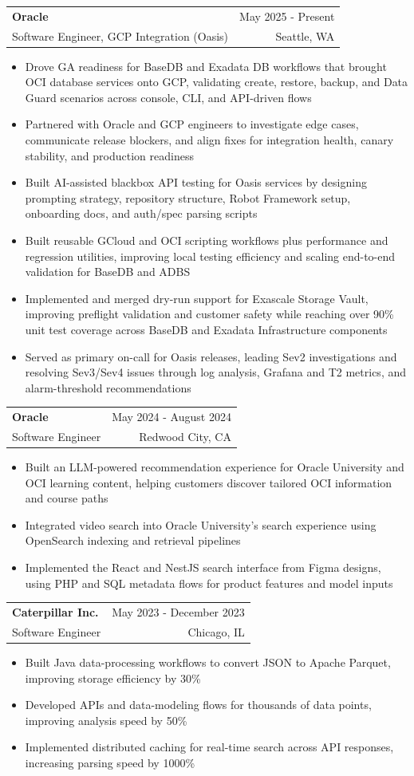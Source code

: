 \documentclass[letterpaper,11pt]{article}
\makeatletter
\newcommand{\resumeItem}[1]{
  \item\small{
    {#1 \vspace{-1pt}}
  }
}
\newcommand{\resumeSubheading}[4]{
  \vspace{-2pt}\item
    \begin{tabular*}{0.97\textwidth}[t]{l@{\extracolsep{\fill}}r}
      \textbf{#1} & #2 \\
      {\small#3} & {\small #4} \\
    \end{tabular*}\vspace{-7pt}
}
\newcommand{\resumeItemListStart}{\begin{itemize}[leftmargin=0.18in,itemsep=1pt,topsep=2pt]}
\newcommand{\resumeItemListEnd}{\end{itemize}\vspace{-5pt}}
\makeatother
\begin{document}
    \resumeSubheading
  {Oracle}{May 2025 - Present}
  {Software Engineer, GCP Integration (Oasis)}{Seattle, WA}
  \resumeItemListStart
    \resumeItem{Drove GA readiness for BaseDB and Exadata DB workflows that brought OCI database services onto GCP, validating create, restore, backup, and Data Guard scenarios across console, CLI, and API-driven flows}
    \resumeItem{Partnered with Oracle and GCP engineers to investigate edge cases, communicate release blockers, and align fixes for integration health, canary stability, and production readiness}
    \resumeItem{Built AI-assisted blackbox API testing for Oasis services by designing prompting strategy, repository structure, Robot Framework setup, onboarding docs, and auth/spec parsing scripts}
    \resumeItem{Built reusable GCloud and OCI scripting workflows plus performance and regression utilities, improving local testing efficiency and scaling end-to-end validation for BaseDB and ADBS}
    \resumeItem{Implemented and merged dry-run support for Exascale Storage Vault, improving preflight validation and customer safety while reaching over 90\% unit test coverage across BaseDB and Exadata Infrastructure components}
    \resumeItem{Served as primary on-call for Oasis releases, leading Sev2 investigations and resolving Sev3/Sev4 issues through log analysis, Grafana and T2 metrics, and alarm-threshold recommendations}
  \resumeItemListEnd

    \resumeSubheading
      {Oracle}{May 2024 - August 2024}
      {Software Engineer}{Redwood City, CA}
      \resumeItemListStart
        \resumeItem{Built an LLM-powered recommendation experience for Oracle University and OCI learning content, helping customers discover tailored OCI information and course paths}
        \resumeItem{Integrated video search into Oracle University's search experience using OpenSearch indexing and retrieval pipelines}
        \resumeItem{Implemented the React and NestJS search interface from Figma designs, using PHP and SQL metadata flows for product features and model inputs}
      \resumeItemListEnd

    \resumeSubheading
      {Caterpillar Inc.}{May 2023 - December 2023}
      {Software Engineer}{Chicago, IL}
      \resumeItemListStart
        \resumeItem{Built Java data-processing workflows to convert JSON to Apache Parquet, improving storage efficiency by 30\%}
        \resumeItem{Developed APIs and data-modeling flows for thousands of data points, improving analysis speed by 50\%}
        \resumeItem{Implemented distributed caching for real-time search across API responses, increasing parsing speed by 1000\%}
      \resumeItemListEnd
\end{document}
